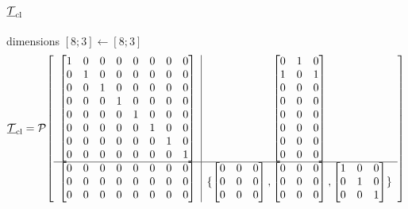 \documentclass{article}
\newcommand{\PIop}[6]{\mathcal P\!\left[\begin{array}{c|c}#1&#2\\\hline#3&\{#4,#5,#6\}\end{array}\right]}
\begin{document}
\paragraph{$\underline{\mathcal T}_{\rm cl}$}\hfill dimensions $[8;3]\leftarrow[8;3]$
\[\displaystyle \underline{\mathcal T}_{\rm cl}=\PIop{\begin{bmatrix}1 & 0 & 0 & 0 & 0 & 0 & 0 & 0\\0 & 1 & 0 & 0 & 0 & 0 & 0 & 0\\0 & 0 & 1 & 0 & 0 & 0 & 0 & 0\\0 & 0 & 0 & 1 & 0 & 0 & 0 & 0\\0 & 0 & 0 & 0 & 1 & 0 & 0 & 0\\0 & 0 & 0 & 0 & 0 & 1 & 0 & 0\\0 & 0 & 0 & 0 & 0 & 0 & 1 & 0\\0 & 0 & 0 & 0 & 0 & 0 & 0 & 1\end{bmatrix}}{\begin{bmatrix}0 & 1 & 0\\1 & 0 & 1\\0 & 0 & 0\\0 & 0 & 0\\0 & 0 & 0\\0 & 0 & 0\\0 & 0 & 0\\0 & 0 & 0\end{bmatrix}}{\begin{bmatrix}0 & 0 & 0 & 0 & 0 & 0 & 0 & 0\\0 & 0 & 0 & 0 & 0 & 0 & 0 & 0\\0 & 0 & 0 & 0 & 0 & 0 & 0 & 0\end{bmatrix}}{\begin{bmatrix}0 & 0 & 0\\0 & 0 & 0\\0 & 0 & 0\end{bmatrix}}{\begin{bmatrix}0 & 0 & 0\\0 & 0 & 0\\0 & 0 & 0\end{bmatrix}}{\begin{bmatrix}1 & 0 & 0\\0 & 1 & 0\\0 & 0 & 1\end{bmatrix}}\]
\end{document}
